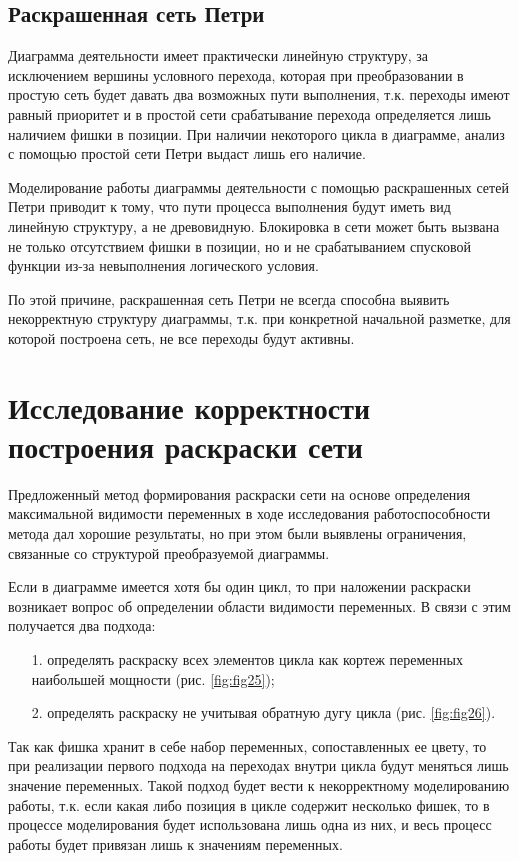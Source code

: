 \subsection{Раскрашенная сеть Петри}

Диаграмма деятельности имеет практически линейную структуру, за исключением вершины условного перехода, которая при преобразовании в простую сеть будет давать два возможных пути выполнения, т.к. переходы имеют равный приоритет и в простой сети срабатывание перехода определяется лишь наличием фишки в позиции. При наличии некоторого цикла в диаграмме, анализ с помощью простой сети Петри выдаст лишь его наличие.

Моделирование работы диаграммы деятельности с помощью раскрашенных сетей Петри приводит к тому, что пути процесса выполнения будут иметь вид линейную структуру, а не древовидную. Блокировка в сети может быть вызвана не только отсутствием фишки в позиции, но и не срабатыванием спусковой функции из-за невыполнения логического условия.

По этой причине, раскрашенная сеть Петри не всегда способна выявить некорректную структуру диаграммы, т.к. при конкретной начальной разметке, для которой построена сеть, не все переходы будут активны.

\section{Исследование корректности построения раскраски сети}

Предложенный метод формирования раскраски сети на основе определения максимальной видимости переменных в ходе исследования работоспособности метода дал хорошие результаты, но при этом были выявлены ограничения, связанные со структурой преобразуемой диаграммы.

Если в диаграмме имеется хотя бы один цикл, то при наложении раскраски возникает вопрос об определении области видимости переменных. В связи с этим получается два подхода:
\begin{itemize}
\item[1.] определять раскраску всех элементов цикла как кортеж переменных наибольшей мощности (рис. \ref{fig:fig25});
\item[2.] определять раскраску не учитывая обратную дугу цикла (рис. \ref{fig:fig26}).
\end{itemize}

Так как фишка хранит в себе набор переменных, сопоставленных ее цвету, то при реализации первого подхода на переходах внутри цикла будут меняться лишь значение переменных. Такой подход будет вести к некорректному моделированию работы, т.к. если какая либо позиция в цикле содержит несколько фишек, то в процессе моделирования будет использована лишь одна из них, и весь процесс работы будет привязан лишь к значениям переменных.


